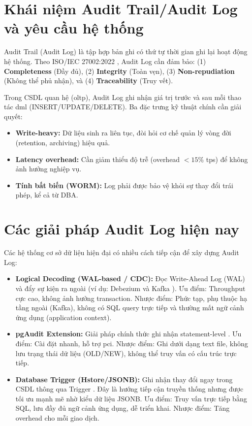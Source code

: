 \section{Khái niệm Audit Trail/Audit Log và yêu cầu hệ thống}

Audit Trail (Audit Log) là tập hợp bản ghi có thứ tự thời gian ghi lại hoạt động hệ thống. Theo ISO/IEC 27002:2022 \cite{ISO27002}, Audit Log cần đảm bảo: (1) \textbf{Completeness} (Đầy đủ), (2) \textbf{Integrity} (Toàn vẹn), (3) \textbf{Non-repudiation} (Không thể phủ nhận), và (4) \textbf{Traceability} (Truy vết).

Trong CSDL quan hệ (\ac{oltp}), Audit Log ghi nhận giá trị trước và sau mỗi thao tác \ac{dml} (INSERT/UPDATE/DELETE). Ba đặc trưng kỹ thuật chính cần giải quyết:

\begin{itemize}
    \item \textbf{Write-heavy:} Dữ liệu sinh ra liên tục, đòi hỏi cơ chế quản lý vòng đời (retention, archiving) hiệu quả.
    \item \textbf{Latency overhead:} Cần giảm thiểu độ trễ (overhead $< 15\%$ \ac{tps}) để không ảnh hưởng nghiệp vụ.
    \item \textbf{Tính bất biến (WORM):} Log phải được bảo vệ khỏi sự thay đổi trái phép, kể cả từ DBA.
\end{itemize}

\section{Các giải pháp Audit Log hiện nay}

Các hệ thống cơ sở dữ liệu hiện đại có nhiều cách tiếp cận để xây dựng Audit Log:

\begin{itemize}
    \item \textbf{Logical Decoding (WAL-based / CDC):} Đọc Write-Ahead Log (WAL) và đẩy sự kiện ra ngoài (ví dụ: Debezium và Kafka \cite{Debezium}). Ưu điểm: Throughput cực cao, không ảnh hưởng transaction. Nhược điểm: Phức tạp, phụ thuộc hạ tầng ngoài (Kafka), không có SQL query trực tiếp và thường mất ngữ cảnh ứng dụng (application context).
    \item \textbf{pgAudit Extension:} Giải pháp chính thức ghi nhận statement-level \cite{pgAudit}. Ưu điểm: Cài đặt nhanh, hỗ trợ \ac{pci}. Nhược điểm: Ghi dưới dạng text file, không lưu trạng thái dữ liệu (OLD/NEW), không thể truy vấn có cấu trúc trực tiếp.
    \item \textbf{Database Trigger (Hstore/JSONB):} Ghi nhận thay đổi ngay trong CSDL thông qua Trigger \cite{Atkins2012}. Đây là hướng tiếp cận truyền thống nhưng được tối ưu mạnh mẽ nhờ kiểu dữ liệu JSONB. Ưu điểm: Truy vấn trực tiếp bằng SQL, lưu đầy đủ ngữ cảnh ứng dụng, dễ triển khai. Nhược điểm: Tăng overhead cho mỗi giao dịch.
\end{itemize}

